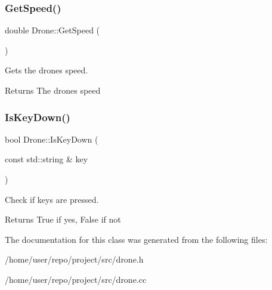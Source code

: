 \subsubsection{\texorpdfstring{Get\+Speed()}{GetSpeed()}}
{\footnotesize\ttfamily double Drone\+::\+Get\+Speed (\begin{DoxyParamCaption}{ }\end{DoxyParamCaption})\hspace{0.3cm}{\ttfamily [inline]}}



Gets the drone\textquotesingle{}s speed. 

\begin{DoxyReturn}{Returns}
The drone\textquotesingle{}s speed 
\end{DoxyReturn}
\mbox{\label{classDrone_a9b164e1535a80ce8e4de11ab0c0edcdc}} 
\subsubsection{\texorpdfstring{Is\+Key\+Down()}{IsKeyDown()}}
{\footnotesize\ttfamily bool Drone\+::\+Is\+Key\+Down (\begin{DoxyParamCaption}\item[{const std\+::string \&}]{key }\end{DoxyParamCaption})}



Check if keys are pressed. 

\begin{DoxyReturn}{Returns}
True if yes, False if not 
\end{DoxyReturn}


The documentation for this class was generated from the following files\+:\begin{DoxyCompactItemize}
\item 
/home/user/repo/project/src/drone.\+h\item 
/home/user/repo/project/src/drone.\+cc\end{DoxyCompactItemize}

